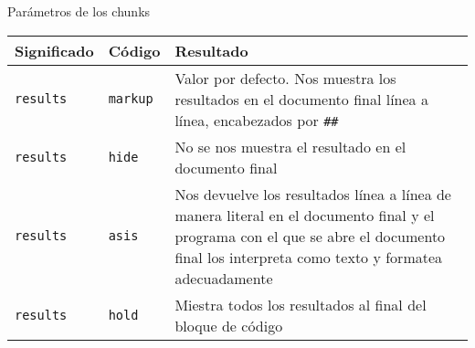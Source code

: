 \documentclass[ignorenonframetext,]{beamer}
\begin{document}
\begin{frame}[fragile]{Parámetros de los chunks}
\protect\hypertarget{parametros-de-los-chunks-5}{}

\begin{longtable}[]{@{}lll@{}}
\toprule
\begin{minipage}[b]{0.30\columnwidth}\raggedright
Significado\strut
\end{minipage} & \begin{minipage}[b]{0.30\columnwidth}\raggedright
Código\strut
\end{minipage} & \begin{minipage}[b]{0.30\columnwidth}\raggedright
Resultado\strut
\end{minipage}\tabularnewline
\midrule
\endhead
\begin{minipage}[t]{0.30\columnwidth}\raggedright
\texttt{results}\strut
\end{minipage} & \begin{minipage}[t]{0.30\columnwidth}\raggedright
\texttt{markup}\strut
\end{minipage} & \begin{minipage}[t]{0.30\columnwidth}\raggedright
Valor por defecto. Nos muestra los resultados en el documento final
línea a línea, encabezados por \texttt{\#\#}\strut
\end{minipage}\tabularnewline
\begin{minipage}[t]{0.30\columnwidth}\raggedright
\texttt{results}\strut
\end{minipage} & \begin{minipage}[t]{0.30\columnwidth}\raggedright
\texttt{hide}\strut
\end{minipage} & \begin{minipage}[t]{0.30\columnwidth}\raggedright
No se nos muestra el resultado en el documento final\strut
\end{minipage}\tabularnewline
\begin{minipage}[t]{0.30\columnwidth}\raggedright
\texttt{results}\strut
\end{minipage} & \begin{minipage}[t]{0.30\columnwidth}\raggedright
\texttt{asis}\strut
\end{minipage} & \begin{minipage}[t]{0.30\columnwidth}\raggedright
Nos devuelve los resultados línea a línea de manera literal en el
documento final y el programa con el que se abre el documento final los
interpreta como texto y formatea adecuadamente\strut
\end{minipage}\tabularnewline
\begin{minipage}[t]{0.30\columnwidth}\raggedright
\texttt{results}\strut
\end{minipage} & \begin{minipage}[t]{0.30\columnwidth}\raggedright
\texttt{hold}\strut
\end{minipage} & \begin{minipage}[t]{0.30\columnwidth}\raggedright
Miestra todos los resultados al final del bloque de código\strut
\end{minipage}\tabularnewline
\bottomrule
\end{longtable}


\end{frame}
\end{document}
